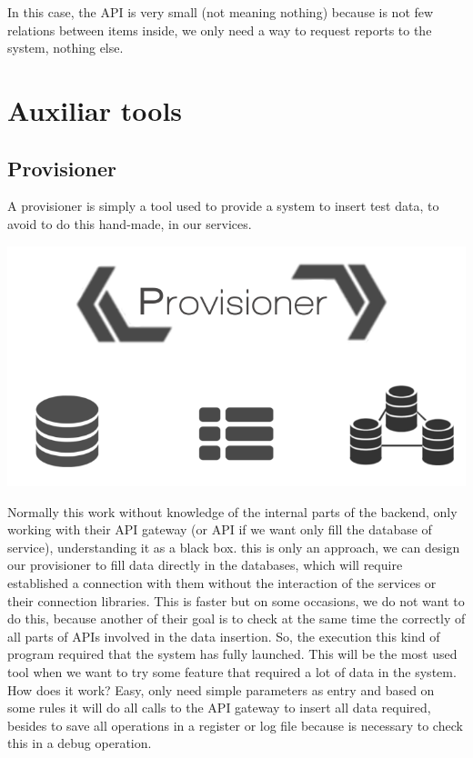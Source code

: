 In this case, the API is very small (not meaning nothing) because is not few
relations between items inside, we only need a way to request reports to the
system, nothing else.



\section{Auxiliar tools}

\subsection{Provisioner}
A provisioner is simply a tool used to provide a system to insert test data, to
avoid to do this hand-made, in our services.

\begin{center}
\includegraphics[scale=0.4]{img/graphics/provisioner.png}
\end{center}

\noindent Normally this work without knowledge
of the internal parts of the backend, only working with their API gateway (or
API if we want only fill the database of service), understanding it as a black box.
this is only an approach, we can design our provisioner to fill data directly
in the databases, which will require established a connection with them without
the interaction of the services or their connection libraries. This is faster but
on some occasions, we do not want to do this, because another of their goal is to
check at the same time the correctly of all parts of APIs involved in the data insertion.
\intro
So, the execution this kind of program required that the system has fully launched.
This will be the most used tool when we want to try some feature that required a
lot of data in the system.
\intro
How does it work? Easy, only need simple parameters as entry and based on some rules it will do all
calls to the API gateway to insert all data required, besides to save all operations
in a register or log file because is necessary to check this in a debug operation.

